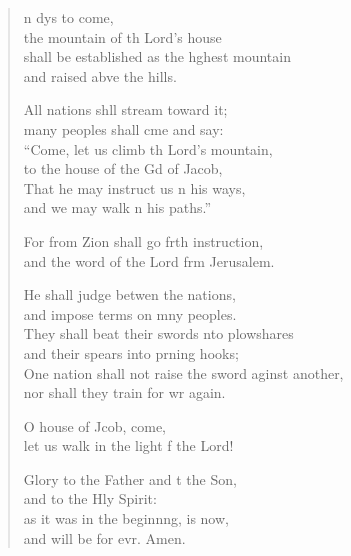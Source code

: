 \settowidth{\versewidth}{One nation shall not raise the sword against another, *}
\begin{verse}%
  \begin{patverse}
n dys to come,\Med\\
the mountain of th Lord’s house\\
shall be established as the h\pointup{\i}ghest mountain\Med\\
and raised abve the hills.

All nations shll stream toward it;\Med\\
many peoples shall cme and say:\\
“Come, let us climb th Lord’s mountain,\Med\\
to the house of the Gd of Jacob,\\
That he may instruct us \pointup{\i}n his ways, \Med\\
and we may walk \pointup{\i}n his paths.”

For from Zion shall go frth instruction,\Med\\
and the word of the Lord frm Jerusalem.

He shall judge betwen the nations,\Med\\
and impose terms on mny peoples.\\
They shall beat their swords \pointup{\i}nto plowshares\Med\\
and their spears into prning hooks;\\
One nation shall not raise the sword aginst another,\Med\\
nor shall they train for wr again.

O house of Jcob, come,\Med\\
let us walk in the light f the Lord!

Glory to the Father and t the Son,\Med\\
    and to the Hly Spirit:\\
as it was in the beginn\pointup{\i}ng, is now,\Med\\
    and will be for evr. Amen.
  \end{patverse}
\end{verse}
